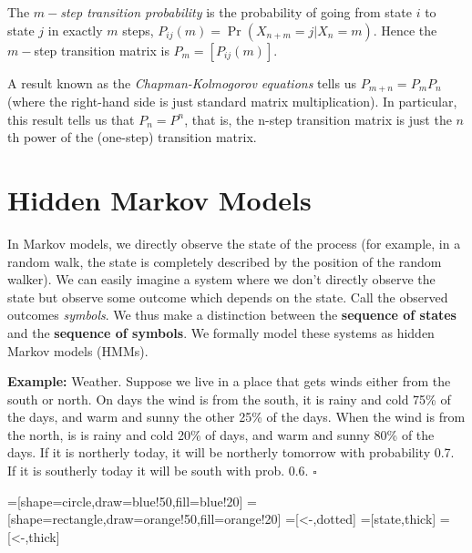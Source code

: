 \documentclass[11pt]{article}
\newcommand{\sqend}{\hfill $\square$}
\begin{document}
 The {\em $m-$step transition probability} is the probability of going from state $i$ to state $j$ in exactly $m$ steps, $P_{ij}(m) = \Pr(X_{n+m} = j|X_n = m).$   
Hence the  $m-$step transition  matrix is $P_m = [P_{ij}(m)]$. 
  
A result known as the {\em Chapman-Kolmogorov equations} tells us $P_{m+n} = P_mP_n$ (where the right-hand side is just standard matrix multiplication). In particular, this result tells us that $P_n = P^n$, that is, the n-step transition matrix is just the $n$th power of the (one-step) transition matrix. 

\newpage
 
\section{Hidden Markov Models}\label{sec:HMM}


In Markov models, we directly observe the state of the process (for example, in a random walk, the state is completely described by the position of the random walker). We can easily imagine a system where we don't directly observe the state but observe some outcome which depends on the state. Call the observed outcomes {\em symbols}.  We thus make a distinction between the {\bf sequence of states} and the {\bf sequence of symbols}.  We formally model these systems as hidden Markov models (HMMs).


{\bf Example:} Weather.  Suppose we live in a place that gets winds  either from the  south or north.  On days the wind is from the south, it is rainy and cold 75\% of the days, and warm and sunny the other 25\% of the days.  When the wind is from the north, is is   rainy and cold 20\% of days, and warm and sunny 80\% of the days.    If it is northerly today, it will be northerly tomorrow with probability 0.7.  If it is southerly today it will be south with prob. 0.6. \sqend


=[shape=circle,draw=blue!50,fill=blue!20]
=[shape=rectangle,draw=orange!50,fill=orange!20]
=[<-,dotted]
=[state,thick]
=[<-,thick]
 
\end{document}
